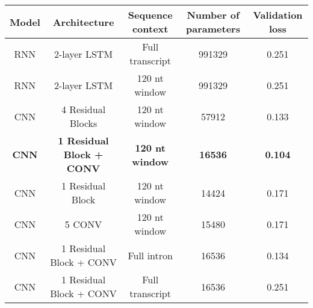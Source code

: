 \documentclass[10.5pt]{article}
\begin{document}
\begin{center}
 \begin{tabular}{||c | c | c | c | c||} 
 \hline
 Model & Architecture & Sequence context & Number of parameters & Validation loss \\ [0.5ex] 
 \hline\hline
 RNN & 2-layer LSTM & Full transcript & 991329 & 0.251 \\ 
 \hline
 RNN & 2-layer LSTM & 120 nt window & 991329 & 0.251 \\ 
 \hline
 CNN & 4 Residual Blocks & 120 nt window & 57912 & 0.133 \\ 
 \hline
  {\bf CNN} & {\bf 1 Residual Block + CONV} & {\bf 120 nt window} & {\bf 16536} & {\bf0.104 } \\ 
 \hline
   CNN &1 Residual Block & 120 nt window & 14424 & 0.171 \\ 
 \hline
   CNN & 5 CONV & 120 nt window & 15480 & 0.171 \\
 \hline
   CNN &1 Residual Block + CONV & Full intron & 16536 & 0.134 \\
\hline
   CNN &1 Residual Block + CONV & Full transcript & 16536 & 0.251 \\
 \hline
 \hline
\end{tabular}
\end{center}
\end{document}
